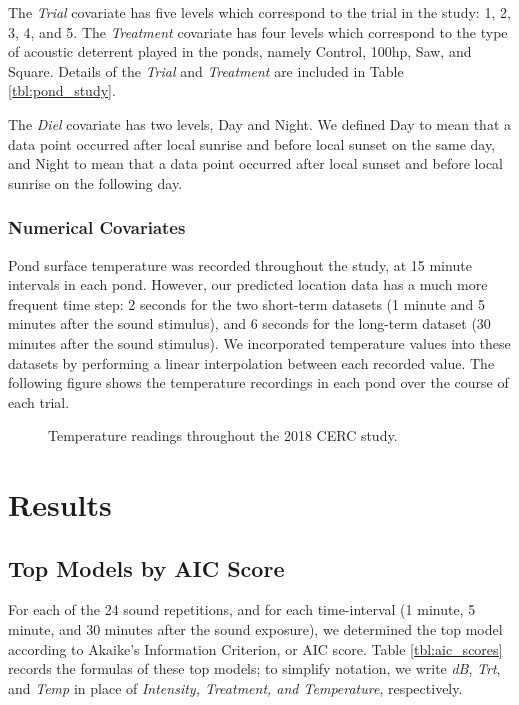 \documentclass[12pt]{article}
\begin{document}
			The \emph{Trial} covariate has five levels which correspond to the trial in the study: 1, 2, 3, 4, and 5. The \emph{Treatment} covariate has four levels which correspond to the type of acoustic deterrent played in the ponds, namely Control, 100hp, Saw, and Square. Details of the \emph{Trial} and \emph{Treatment} are included in Table \ref{tbl:pond_study}.
			
			The \emph{Diel} covariate has two levels, Day and Night. We defined Day to mean that a data point occurred after local sunrise and before local sunset on the same day, and Night to mean that a data point occurred after local sunset and before local sunrise on the following day.
		
		\subsubsection{Numerical Covariates} \label{sec:num-cov}
		
			Pond surface temperature was recorded throughout the study, at 15 minute intervals in each pond. However, our predicted location data has a much more frequent time step: 2 seconds for the two short-term datasets (1 minute and 5 minutes after the sound stimulus), and 6 seconds for the long-term dataset (30 minutes after the sound stimulus). We incorporated temperature values into these datasets by performing a linear interpolation between each recorded value. The following figure shows the temperature recordings in each pond over the course of each trial.
			
			\begin{figure}

				\caption{Temperature readings throughout the 2018 CERC study.}
				\label{img:temperature}
			\end{figure}
		
			

\section{Results}

	\subsection{Top Models by AIC Score}
		
		For each of the 24 sound repetitions, and for each time-interval (1 minute, 5 minute, and 30 minutes after the sound exposure), we determined the top model according to Akaike's Information Criterion, or AIC score. Table \ref{tbl:aic_scores} records the formulas of these top models; to simplify notation, we write \emph{dB}, \emph{Trt}, and \emph{Temp} in place of \emph{Intensity, Treatment, and Temperature}, respectively.
		
\end{document}
